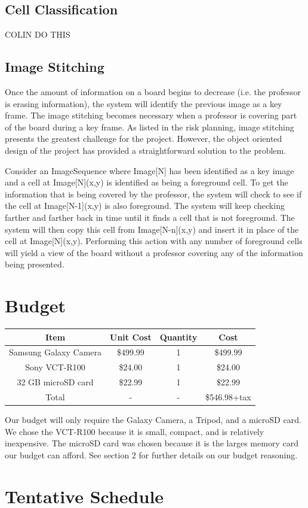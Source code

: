 \documentclass[]{article}
\begin{document}
		\subsection{Cell Classification}
			COLIN DO THIS
			
		\subsection{Image Stitching}
			Once the amount of information on a board begins to decrease (i.e. the professor is erasing information), the system will identify the previous image as a key frame. The image stitching becomes necessary when a professor is covering part of the board during a key frame. As listed in the risk planning, image stitching presents the greatest challenge for the project. However, the object oriented design of the project has provided a straightforward solution to the problem. 
			
			Consider an ImageSequence where Image[N] has been identified as a key image and a cell at Image[N](x,y) is identified as being a foreground cell. To get the information that is being covered by the professor, the system will check to see if the cell at Image[N-1](x,y) is also foreground. The system will keep checking farther and farther back in time until it finds a cell that is not foreground. The system will then copy this cell from Image[N-n](x,y) and insert it in place of the cell at Image[N](x,y). Performing this action with any number of foreground cells will yield a view of the board without a professor covering any of the information being presented.
	
	\section{Budget}
	
		\begin{tabular}{| c | c | c | c |}
			\hline
			Item					&	Unit Cost		&	Quantity		&	Cost		\\
			\hline
			Samsung Galaxy Camera	&	\$499.99		&	1				&	\$499.99	\\
			\hline
			Sony VCT-R100			&	\$24.00			&	1				&	\$24.00 	\\
			\hline
			32 GB microSD card		&	\$22.99			&	1				&	\$22.99 	\\
			\hline
			Total					&		-			&	-				&	\$546.98+tax\\
			\hline
			
		
		\end{tabular}
	
	Our budget will only require the Galaxy Camera, a Tripod, and a microSD card. We chose the VCT-R100 because it is small, compact, and is relatively inexpensive. The microSD card was chosen because it is the larges memory card our budget can afford. See section 2 for further details on our budget reasoning.
	
	\section{Tentative Schedule}
		
		
		
			
\end{document}
